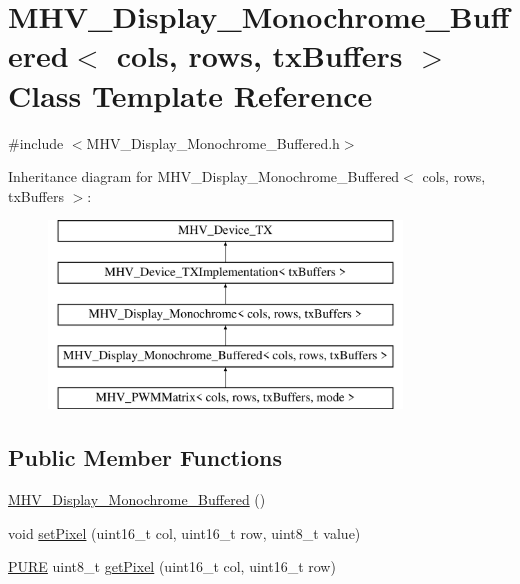 \hypertarget{class_m_h_v___display___monochrome___buffered}{\section{M\-H\-V\-\_\-\-Display\-\_\-\-Monochrome\-\_\-\-Buffered$<$ cols, rows, tx\-Buffers $>$ Class Template Reference}
\label{class_m_h_v___display___monochrome___buffered}
}


{\ttfamily \#include $<$M\-H\-V\-\_\-\-Display\-\_\-\-Monochrome\-\_\-\-Buffered.\-h$>$}

Inheritance diagram for M\-H\-V\-\_\-\-Display\-\_\-\-Monochrome\-\_\-\-Buffered$<$ cols, rows, tx\-Buffers $>$\-:\begin{figure}[H]
\begin{center}
\leavevmode
\includegraphics[height=5.000000cm]{class_m_h_v___display___monochrome___buffered}
\end{center}
\end{figure}
\subsection*{Public Member Functions}
\begin{DoxyCompactItemize}
\item 
\hyperlink{class_m_h_v___display___monochrome___buffered_a5505c5c2195e5ddc337def03c428eec6}{M\-H\-V\-\_\-\-Display\-\_\-\-Monochrome\-\_\-\-Buffered} ()
\item 
void \hyperlink{class_m_h_v___display___monochrome___buffered_a3f3d51702bdef41ab16d6897cbb0e79c}{set\-Pixel} (uint16\-\_\-t col, uint16\-\_\-t row, uint8\-\_\-t value)
\item 
\hyperlink{_m_h_v__io_8h_acd42770aecb025cfac170d4d3ace4544}{P\-U\-R\-E} uint8\-\_\-t \hyperlink{class_m_h_v___display___monochrome___buffered_aed8f8182bcda44ed396e2b347fdd1318}{get\-Pixel} (uint16\-\_\-t col, uint16\-\_\-t row)
\end{DoxyCompactItemize}
